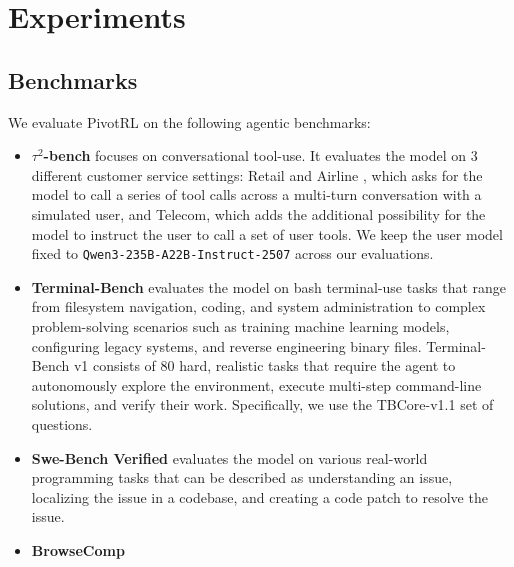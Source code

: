 \section{Experiments}
\label{sec:experiments}

\subsection{Benchmarks}
We evaluate PivotRL on the following agentic benchmarks:
\begin{itemize}
  \item \textbf{$\tau^2$-bench} \citep{barres2025tau2bench} focuses on conversational tool-use. It evaluates the model on 3 different customer service settings: Retail and Airline \citep{yao2024taubench}, which asks for the model to call a series of tool calls across a multi-turn conversation with a simulated user, and Telecom, which adds the additional possibility for the model to instruct the user to call a set of user tools. We keep the user model fixed to \texttt{Qwen3-235B-A22B-Instruct-2507} \citet{qwen3technicalreport} across our evaluations.
  \item \textbf{Terminal-Bench} \citep{tbench_2025} evaluates the model on bash terminal-use tasks that range from filesystem navigation, coding, and system administration to complex problem-solving scenarios such as training machine learning models, configuring legacy systems, and reverse engineering binary files. Terminal-Bench v1 consists of 80 hard, realistic tasks that require the agent to autonomously explore the environment, execute multi-step command-line solutions, and verify their work. Specifically, we use the TBCore-v1.1 set of questions.
  \item \textbf{Swe-Bench Verified} \citep{jimenez2024swebench} evaluates the model on various real-world programming tasks that can be described as understanding an issue, localizing the issue in a codebase, and creating a code patch to resolve the issue.
  \item \textbf{BrowseComp}
  \citep{wei2025browsecompsimplechallengingbenchmark} 
\end{itemize}

